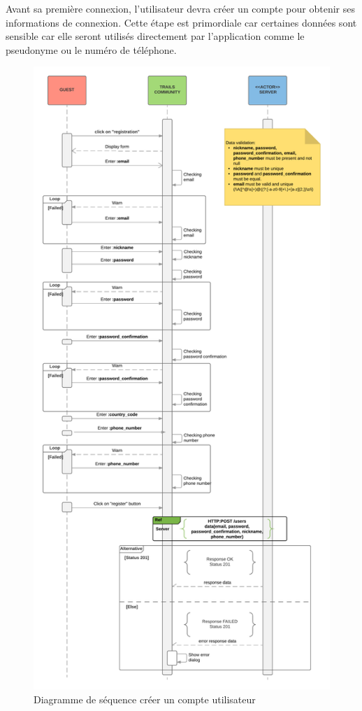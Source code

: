 \documentclass[titlepage, 12pt]{report}
\begin{document}
Avant sa première connexion, l'utilisateur devra créer un compte pour obtenir ses informations de connexion. Cette étape est primordiale car certaines données sont sensible car elle seront utilisés directement par l'application comme le pseudonyme ou le numéro de téléphone.


\begin{figure}[!h]
	\caption{Diagramme de séquence créer un compte utilisateur}
	\label{register_sequence_diagram}
	\centering
	\includegraphics[scale=0.12]{Images/diagram/registration_sequence_diagram.png}
\end{figure}
\end{document}
